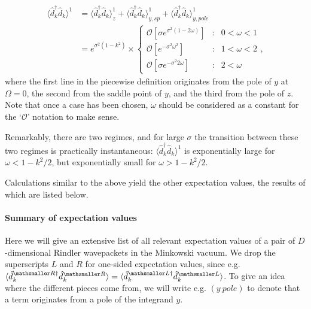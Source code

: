 \documentclass[11pt, a4paper]{article}
\newcommand{\om}{\omega}
\newcommand{\Om}{\Omega}
\newcommand{\si}{{\sigma}}
\newcommand{\ms}{\mathsmaller}
\newcommand{\nodagger}{{\phantom{\dagger}}}
\newcommand{\ddd}{\langle \hat d_k^\dagger \hat d^\nodagger_k \rangle}
\begin{document}
\begin{enumerate}
\begin{align*}
\ddd^1&=\ddd^1_z+\ddd^1_{y,sp}+\ddd^1_{y,pole}\\
&=e^{\si^2(1-k^2)}\times
\left\{\begin{array}{lll}
\mathcal O [\si e^{\si^2(1-2\om)}] &:&  0<\om <1\\
\mathcal O [ e^{-\si^2\om^2}] &:&  1<\om <2\\
\mathcal O [\si e^{-\si^2 2\om}] &:&  2<\omega
\end{array}\right. ,
\end{align*}
where the first line in the piecewise definition originates from the pole of $y$ at $\Om=0$, the second from the saddle point of $y$, and the third from the pole of $z$. Note that once a case has been chosen, $\om$ should be considered as a constant for the `$\mathcal O$' notation to make sense. 

Remarkably, there are two regimes, and for large $\si$ the transition between these two regimes is practically instantaneous: $\ddd^1$ is exponentially large for $\om<1-k^2/2$, but exponentially small for $\om>1-k^2/2$.
\end{enumerate}
Calculations similar to the above yield the other expectation values, the results of which are listed below. 
\paragraph{Summary of expectation values} 
Here we will give an extensive list of all relevant expectation values of a pair of $D$-dimensional Rindler wavepackets in the Minkowski vacuum. We drop the superscripts $L$ and $R$ for one-sided expectation values, since e.g. $\langle \hat d_k^{\ms R\dagger} \hat d_k^{\ms R} \rangle=\langle \hat d_k^{\ms L\dagger} \hat d_k^{\ms L}  \rangle$. To give an idea where the different pieces come from, we will write e.g. $(y\ pole)$ to denote that a term originates from a pole of the integrand $y$.  
\end{document}
